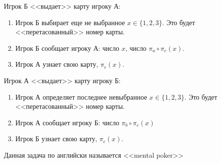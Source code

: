 \documentclass[pdftex,12pt,a4paper]{article}
\begin{document}
Игрок Б <<выдает>> карту игроку А:
\begin{enumerate}[resume]
\item Игрок Б выбирает еще не выбранное $x\in\{1,2,3\}$. Это будет <<перетасованный>> номер карты.
\item Игрок Б сообщает игроку А: число $x$, число $\pi_a\circ \pi_c(x)$.
\item Игрок А узнает свою карту, $\pi_c(x)$.
\end{enumerate}

Игрок А <<выдает>> карту игроку Б:
\begin{enumerate}[resume]
\item Игрок А определяет последнее невыбранное $x\in\{1,2,3\}$. Это будет <<перетасованный>> номер карты.
\item Игрок А сообщает игроку Б: число $\pi_b\circ \pi_c(x)$
\item Игрок Б узнает свою карту, $\pi_c(x)$.
\end{enumerate}

Данная задача по английски называется <<mental poker>>
\end{document}
